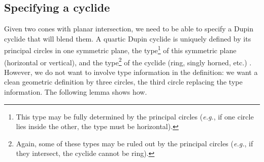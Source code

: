 \subsection{Specifying a cyclide}
\label{section:spec}

Given two cones with planar intersection, we need to be able to specify
a Dupin cyclide that will blend them.  
A quartic Dupin cyclide is uniquely defined by its principal circles in one
symmetric plane, the type\footnote{This type may be fully determined by the
	principal circles ({\em e.g.}, if one circle lies inside the other, 
	the type must be horizontal).}
of this symmetric plane (horizontal or vertical),
and the type\footnote{Again, some of these types may be ruled out 
	by the principal circles ({\em e.g.}, if they intersect, the cyclide
	cannot be ring).} 
of the cyclide (ring, singly horned, etc.) \cite{jj92}.
However, we do not want to involve type information in the definition:
we want a clean geometric definition by three circles, the third circle
replacing the type information.
The following lemma shows how.


